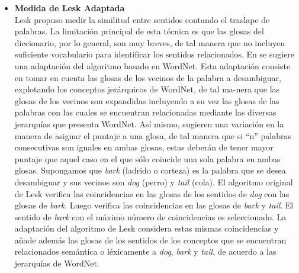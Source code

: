 \begin{itemize}
  \item \textbf{Medida de Lesk Adaptada}\\
    Lesk propuso medir la similitud entre sentidos contando el traslape de palabras. La limitación principal de esta técnica es que las glosas del diccionario, por lo general, son muy breves, de tal manera que no incluyen suficiente vocabulario para identificar los sentidos relacionados. En \cite{006} se sugiere una adaptación del algoritmo basado en WordNet. Esta adaptación consiste en tomar en cuenta las glosas de los vecinos de la palabra a desambiguar, explotando los conceptos jerárquicos de WordNet, de tal ma-nera que las glosas de los vecinos son expandidas incluyendo a su vez las glosas de las palabras con las cuales se encuentran relacionadas mediante las diversas jerarquías que presenta WordNet. Así mismo, sugieren una variación en la manera de asignar el puntaje a una glosa, de tal manera que si “n” palabras consecutivas son iguales en ambas glosas, estas deberán de tener mayor puntaje que aquel caso en el que sólo coincide una sola palabra en ambas glosas. 
    Supongamos que \textit{bark} (ladrido o corteza) es la palabra que se desea desambiguar y sus vecinos son \textit{dog} (perro) y \textit{tail} (cola). El algoritmo original de Lesk verifica las coincidencias en las glosas de los sentidos de \textit{dog} con las glosas de \textit{bark}. Luego verifica las coincidencias en las glosas de \textit{bark} y \textit{tail}. El sentido de \textit{bark} con el máximo número de coincidencias es seleccionado. La adaptación del algoritmo de Lesk considera estas mismas coincidencias y añade además las glosas de los sentidos de los conceptos que se encuentran relacionados semántica o léxicamente a \textit{dog}, \textit{bark} y \textit{tail}, de acuerdo a las jerarquías de WordNet.
\end{itemize}

